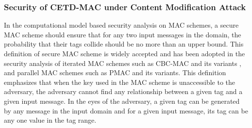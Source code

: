 \documentclass{article}
\newtheorem{theorem}{Theorem}[section]
\begin{document}

\subsubsection{Security of CETD-MAC under Content Modification Attack}
In the computational model based security analysis on MAC schemes, a secure MAC scheme should ensure that for any two input messages in the domain, the probability that their tags collide should be no more than an upper bound. This definition of secure MAC scheme is widely accepted and has been adopted in the security analysis of iterated MAC schemes such as CBC-MAC \cite{} and its variants \cite{}, and parallel MAC schemes such as PMAC \cite{} and its variants\cite{}. This definition emphasizes that when the key used in the MAC scheme is unaccessible to the adversary, the adversary cannot find any relationship between a given tag and a given input message. In the eyes of the adversary, a given tag can be generated by any message in the input domain and for a given input message, its tag can be any one value in the tag range. 
\end{document}
